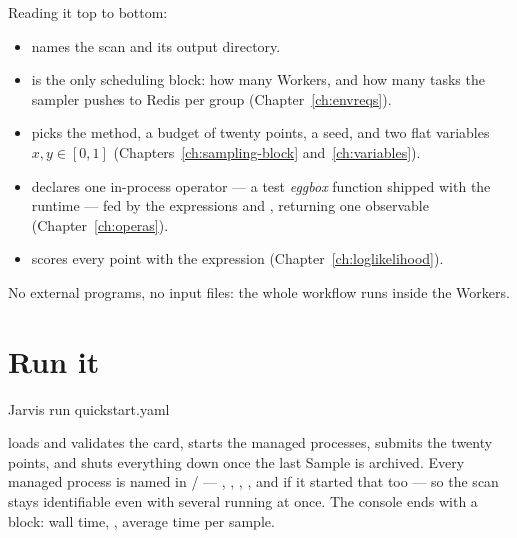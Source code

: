 Reading it top to bottom:

\begin{itemize}
  \item {} names the scan and its output directory.
  \item {} is the only scheduling block: how many Workers, and how many
        tasks the sampler pushes to Redis per group (Chapter~\ref{ch:envreqs}).
  \item {} picks the  method, a budget of twenty points, a
        seed, and two flat variables $x,y\in[0,1]$ (Chapters~\ref{ch:sampling-block}
        and~\ref{ch:variables}).
  \item {} declares one in-process operator --- a test
        \emph{eggbox} function shipped with the runtime --- fed by the expressions
         and , returning one observable 
        (Chapter~\ref{ch:operas}).
  \item {} scores every point with the expression 
        (Chapter~\ref{ch:loglikelihood}).
\end{itemize}

No external programs, no input files: the whole workflow runs inside the Workers.

\section{Run it}
\label{sec:quickstart-run}

\begin{terminal}
\begin{jcmd}
Jarvis run quickstart.yaml
\end{jcmd}
\end{terminal}

 loads and validates the card, starts the managed processes, submits
the twenty points, and shuts everything down once the last Sample is archived. Every
managed process is named  in / ---
, ,
,
, and  if it
started that too --- so the scan
stays identifiable even with several running at once. The console ends with a
 block: wall time, , average time per
sample.

